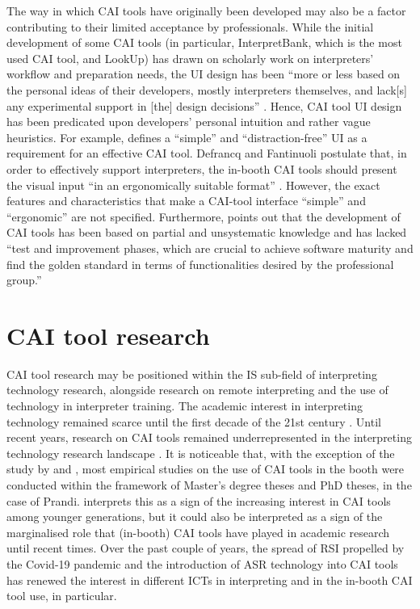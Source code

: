 The way in which CAI tools have originally been developed may also be a factor contributing to their limited acceptance by professionals. While the initial development of some CAI tools (in particular, InterpretBank, which is the most used CAI tool, and LookUp) has drawn on scholarly work on interpreters’ workflow and preparation needs, the UI design has been ``more or less based on the personal ideas of their developers, mostly interpreters themselves, and lack[s] any experimental support in [the] design decisions'' \citep[160]{fantinuoli2018b}. Hence, CAI tool UI design has been predicated upon developers’ personal intuition and rather vague heuristics. For example, \citet[62]{fantinuoli2017speech} defines a ``simple'' and ``distraction-free'' UI as a requirement for an effective CAI tool. Defrancq and Fantinuoli postulate that, in order to effectively support interpreters, the in-booth CAI tools should present the visual input ``in an ergonomically suitable format'' \citep[4]{defrancq2021automatic}. However, the exact features and characteristics that make a CAI-tool interface ``simple'' and ``ergonomic'' are not specified. Furthermore, \citet[164]{fantinuoli2018b} points out that the development of CAI tools has been based on partial and unsystematic knowledge and has lacked ``test and improvement phases, which are crucial to achieve software maturity and find the golden standard in terms of functionalities desired by the professional group.''


\section{CAI tool research}

CAI tool research may be positioned within the IS sub-field of interpreting technology research, alongside research on remote interpreting and the use of technology in interpreter training. The academic interest in interpreting technology remained scarce until the first decade of the 21st century \citep{berber2010information}. Until recent years, research on CAI tools remained underrepresented in the interpreting technology research landscape \citep{fantinuoli2018b}. It is noticeable that, with the exception of the study by \citet{desmet2018simultaneous} and \citet{defrancq2021automatic}, most empirical studies on the use of CAI tools in the booth were conducted within the framework of Master’s degree theses and PhD theses, in the case of Prandi. \citet[87]{prandi2022b} interprets this as a sign of the increasing interest in CAI tools among younger generations, but it could also be interpreted as a sign of the marginalised role that (in-booth) CAI tools have played in academic research until recent times. Over the past couple of years, the spread of RSI propelled by the Covid-19 pandemic and the introduction of ASR technology into CAI tools has renewed the interest in different ICTs in interpreting and in the in-booth CAI tool use, in particular.

